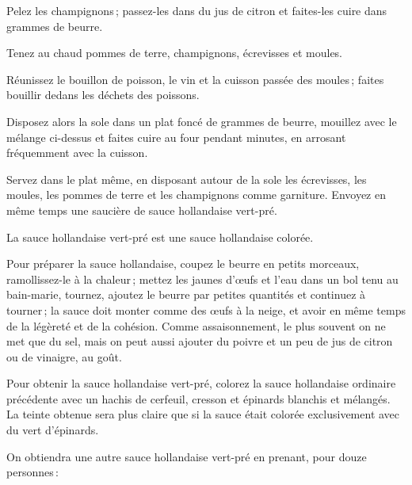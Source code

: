 Pelez les champignons ; passez-les dans du jus de citron et faites-les cuire
dans {\mmm} grammes de beurre.

Tenez au chaud pommes de terre, champignons, écrevisses et moules.

Réunissez le bouillon de poisson, le vin et la cuisson passée des moules ;
faites bouillir dedans les déchets des poissons.

Disposez alors la sole dans un plat foncé de {\mmm} grammes de beurre, mouillez
avec le mélange ci-dessus et faites cuire au four pendant {\mmm} minutes, en
arrosant fréquemment avec la cuisson.

Servez dans le plat même, en disposant autour de la sole les écrevisses, les
moules, les pommes de terre et les champignons comme garniture. Envoyez en
même temps une saucière de sauce hollandaise vert-pré.

\sk

La sauce hollandaise vert-pré est une sauce hollandaise colorée.

\label{pg0362} \hypertarget{p0362}{}
Pour préparer la sauce hollandaise, coupez le beurre en petits morceaux,
ramollissez-le à la chaleur ; mettez les jaunes d'œufs et l'eau dans un bol
tenu au bain-marie, tournez, ajoutez le beurre par petites quantités et
continuez à tourner ; la sauce doit monter comme des œufs à la neige, et avoir
en même temps de la légèreté et de la cohésion. Comme assaisonnement, le plus
souvent on ne met que du sel, mais on peut aussi ajouter du poivre et un peu de
jus de citron ou de vinaigre, au goût.

Pour obtenir la sauce hollandaise vert-pré, colorez la sauce hollandaise
ordinaire précédente avec un hachis de cerfeuil, cresson et épinards blanchis
et mélangés. La teinte obtenue sera plus claire que si la sauce était colorée
exclusivement avec du vert d'épinards.

\sk

On obtiendra une autre sauce hollandaise vert-pré en prenant, pour douze
personnes :

\medskip

